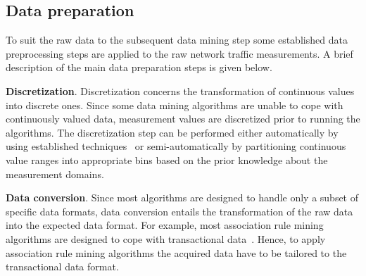 \documentclass[conference]{IEEEtran}
\begin{document}
\subsection{Data preparation}
\label{dataprep}

To suit the raw data to the subsequent data mining step some established data preprocessing steps are applied to the raw network traffic measurements. 
A brief description of the main data preparation steps is given below.

\textbf{Discretization}. Discretization concerns the transformation of continuous values into discrete ones. Since some data mining algorithms are unable to cope with continuously valued data, 
measurement values are discretized prior to running the algorithms. 
The discretization step can be performed either automatically by using established techniques~\cite{libroKumar} or semi-automatically by partitioning continuous value ranges into appropriate bins based on the prior knowledge about the measurement domains. 

\textbf{Data conversion}. Since most algorithms are designed to handle only a subset of specific data formats, data conversion entails the transformation of the raw data into the expected data format. For example, most association rule mining algorithms are designed to cope with transactional data~\cite{libroKumar}. Hence, to apply association rule mining algorithms the acquired data have to be tailored to the transactional data format. 
\end{document}
